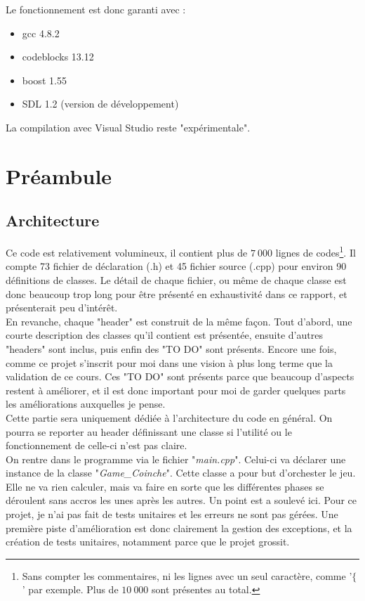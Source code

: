 \documentclass[a4paper,11pt]{article}
\begin{document}
Le fonctionnement est donc garanti avec :
\begin{itemize}
\item gcc 4.8.2
\item codeblocks 13.12
\item boost 1.55
\item SDL 1.2 (version de développement)
\end{itemize}

La compilation avec Visual Studio reste "expérimentale".
\clearpage
\section{Préambule}
\subsection{Architecture}
Ce code est relativement volumineux, il contient plus de $7~000$ lignes de codes\footnote{Sans compter les commentaires, ni les lignes avec un seul caractère, comme '$\{$' par exemple. Plus de $10~000$ sont présentes au total.}. Il compte 73 fichier de déclaration (.h) et 45 fichier source (.cpp) pour environ 90 définitions de classes. Le détail de chaque fichier, ou même de chaque classe est donc beaucoup trop long pour être présenté en exhaustivité dans ce rapport, et présenterait peu d'intérêt. \\
En revanche, chaque "header" est construit de la même façon. Tout d'abord, une courte description des classes qu'il contient est présentée, ensuite d'autres "headers" sont inclus, puis enfin des "TO DO" sont présents. Encore une fois, comme ce projet s'inscrit pour moi dans une vision à plus long terme que la validation de ce cours. Ces "TO DO" sont présents parce que beaucoup d'aspects restent à améliorer, et il est donc important pour moi de garder quelques parts les améliorations auxquelles je pense.\\
Cette partie sera uniquement dédiée à l'architecture du code en général. On pourra se reporter au header définissant une classe si l'utilité ou le fonctionnement de celle-ci n'est pas claire. \\

On rentre dans le programme via le fichier "\textit{main.cpp}". Celui-ci va déclarer une instance de la classe "\textit{Game\_Coinche}". Cette classe a pour but d'orchester le jeu. Elle ne va rien calculer, mais va faire en sorte que les différentes phases se déroulent sans accros les unes après les autres. Un point est a soulevé ici. Pour ce projet, je n'ai pas fait de tests unitaires et les erreurs ne sont pas gérées. Une première piste d'amélioration est donc clairement la gestion des exceptions, et la création de tests unitaires, notamment parce que le projet grossit. \\
\end{document}
